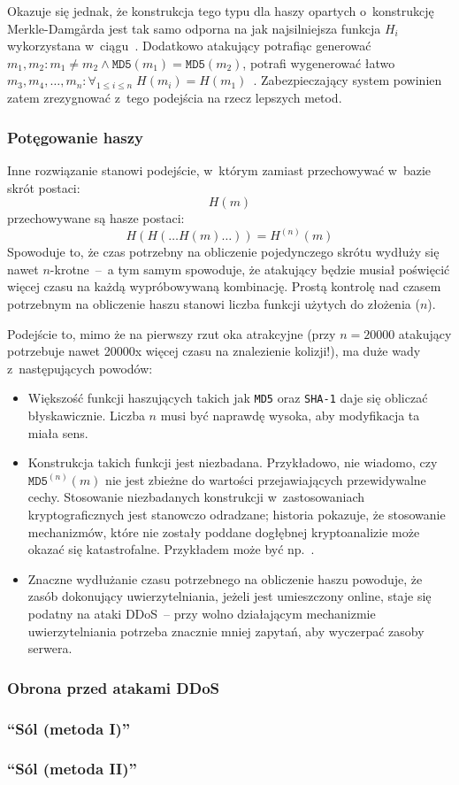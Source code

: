 Okazuje się jednak, że konstrukcja tego typu dla haszy opartych o~konstrukcję
Merkle-Damg\r{a}rda jest tak samo odporna na  jak
najsilniejsza funkcja $H_i$ wykorzystana w~ciągu~\cite{md5_concatenation}.
Dodatkowo atakujący potrafiąc generować $m_1, m_2 : m_1 \neq m_2 \wedge
\mathtt{MD5}(m_1) = \mathtt{MD5}(m_2)$, potrafi wygenerować łatwo $m_3, m_4,
\ldots, m_n : \forall_{1 \leq i \leq n} \; H(m_i) =
H(m_1)$~\cite{md5_multi_collision_attack}. Zabezpieczający system powinien
zatem zrezygnować z~tego podejścia na rzecz lepszych metod.

\subsubsection{Potęgowanie haszy}

Inne rozwiązanie stanowi podejście, w~którym zamiast przechowywać w~bazie skrót
postaci:
    $$H(m)$$
przechowywane są hasze postaci:
    $$H(H(\ldots H(m) \ldots)) = H^{(n)}(m)$$
Spowoduje to, że czas potrzebny na obliczenie pojedynczego skrótu wydłuży się
nawet $n$-krotne~--~a tym samym spowoduje, że atakujący będzie musiał poświęcić
więcej czasu na każdą wypróbowywaną kombinację. Prostą kontrolę nad czasem
potrzebnym na obliczenie haszu stanowi liczba funkcji użytych do złożenia
($n$).

Podejście to, mimo że na pierwszy rzut oka atrakcyjne (przy $n = 20000$
atakujący potrzebuje nawet 20000x więcej czasu na znalezienie kolizji!), ma
duże wady z~następujących powodów:

\begin{itemize}

\item Większość funkcji haszujących takich jak \texttt{MD5} oraz \texttt{SHA-1}
daje się obliczać błyskawicznie. Liczba $n$ musi być naprawdę wysoka, aby
modyfikacja ta miała sens.

\item Konstrukcja takich funkcji jest niezbadana. Przykładowo, nie wiadomo, czy
$\mathtt{MD5}^{(n)}(m)$ nie jest zbieżne do wartości przejawiających przewidywalne
cechy. Stosowanie niezbadanych konstrukcji w~zastosowaniach kryptograficznych
jest stanowczo odradzane; historia pokazuje, że stosowanie mechanizmów, które
nie zostały poddane dogłębnej kryptoanalizie może okazać się katastrofalne.
Przykładem może być np.~\cite{untested_cryptography}.

\item Znaczne wydłużanie czasu potrzebnego na obliczenie haszu powoduje, że
zasób dokonujący uwierzytelniania, jeżeli jest umieszczony online, staje się
podatny na ataki DDoS~-- przy wolno działającym mechanizmie uwierzytelniania
potrzeba znacznie mniej zapytań, aby wyczerpać zasoby serwera.

\end{itemize}

\subsubsection{Obrona przed atakami DDoS}

\subsubsection{``Sól (metoda I)''}

\subsubsection{``Sól (metoda II)''}
